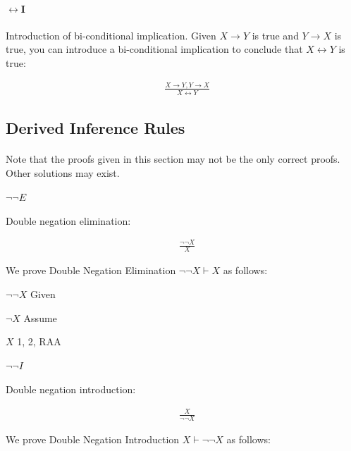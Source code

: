 \documentclass{article}
\newcommand{\indentitem}{\addtolength\itemindent{20pt}}
\theoremstyle{plain}
\theoremstyle{definition}
\begin{document}
\begin{multicols}{2}
\paragraph{$\leftrightarrow$I} Introduction of bi-conditional implication. Given $X \rightarrow Y$ is true and $Y \rightarrow X$ is true, you can introduce a bi-conditional implication to conclude that $X \leftrightarrow Y$ is true:

\begin{align*}
 &\frac{X \rightarrow Y, Y \rightarrow X}{X \leftrightarrow Y}
\end{align*}  

\subsection{Derived Inference Rules}

\paragraph{} Note that the proofs given in this section may not be the only correct proofs. Other solutions may exist.

\paragraph{$\lnot \lnot E$} Double negation elimination:

\begin{align*}
 &\frac{\lnot \lnot X}{X}
\end{align*}  

\noindent We prove Double Negation Elimination $\lnot\lnot X \vdash X$ as follows:

\begin{enumerate}
\item $\lnot \lnot X$ \hfill Given
{\indentitem
\item $\lnot X$ \hfill Assume
}
\item $X$ \hfill 1, 2, RAA
\end{enumerate}

\paragraph{$\lnot \lnot I$} Double negation introduction:

\begin{align*}
 &\frac{X}{\lnot \lnot X}
\end{align*}

\noindent We prove Double Negation Introduction $X \vdash \lnot\lnot X$ as follows:


\end{multicols}
\end{document}
